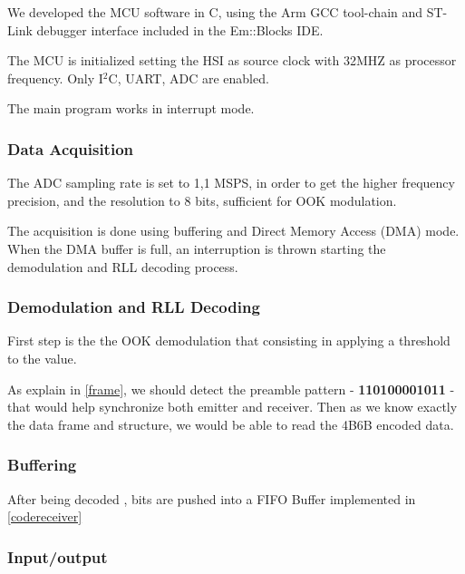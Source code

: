 We developed the MCU software in C, using the Arm GCC tool-chain and ST-Link debugger interface included in the Em::Blocks \citep{emblocks} IDE.

The MCU is initialized setting the HSI as source clock with 32MHZ as processor frequency. Only I$^2$C, UART, ADC are enabled.

The main program works in interrupt mode. 

\subsubsection{Data Acquisition}

The ADC sampling rate is set to 1,1 MSPS, in order to get the higher frequency precision, and the resolution to 8 bits, sufficient for OOK modulation.

The acquisition is done using buffering and Direct Memory Access (DMA) mode. 
When the DMA buffer is full, an interruption is thrown starting the demodulation and RLL decoding process.

\subsubsection{Demodulation and RLL Decoding}

First step is the the OOK demodulation that consisting in applying a threshold to the value.



As explain in \ref{frame}, we should detect the preamble pattern - \textbf{110100001011} - that would help synchronize both emitter and receiver.
Then as we know exactly the data frame and structure, we would be able to read the 4B6B encoded data.


\subsubsection{Buffering}


After being decoded , bits are pushed into a FIFO Buffer implemented in \ref{codereceiver}



\subsubsection{Input/output}
 
